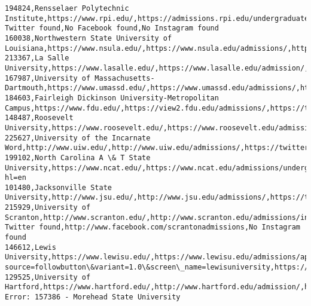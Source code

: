 \documentclass[11pt]{article}
\begin{document}
\begin{Verbatim}[commandchars=\\\{\}]
194824,Rensselaer Polytechnic Institute,https://www.rpi.edu/,https://admissions.rpi.edu/undergraduate,No Twitter found,No Facebook found,No Instagram found
160038,Northwestern State University of Louisiana,https://www.nsula.edu/,https://www.nsula.edu/admissions/,https://twitter.com/nsula,https://www.facebook.com/NorthwesternState,http://instagram.com/nsula
213367,La Salle University,https://www.lasalle.edu/,https://www.lasalle.edu/admission/,https://www.twitter.com/lasalleuniv,https://www.facebook.com/lasalleuniversity,https://www.instagram.com/lasalleuniv
167987,University of Massachusetts-Dartmouth,https://www.umassd.edu/,https://www.umassd.edu/admissions/,https://twitter.com/umassd,https://www.facebook.com/umassd,https://www.instagram.com/umassd/
184603,Fairleigh Dickinson University-Metropolitan Campus,https://www.fdu.edu/,https://view2.fdu.edu/admissions/,https://twitter.com/FDUWhatsNew,https://www.facebook.com/fairleighdickinsonuniversity,https://instagram.com/fduwhatsnew\#
148487,Roosevelt University,https://www.roosevelt.edu/,https://www.roosevelt.edu/admission,https://twitter.com/RooseveltU,https://www.facebook.com/RooseveltUniversity,https://www.instagram.com/RooseveltU/
225627,University of the Incarnate Word,http://www.uiw.edu/,http://www.uiw.edu/admissions/,https://twitter.com/uiw\_admissions,https://www.facebook.com/uiwartsfestival/,https://www.instagram.com/p/BpaCpSXH4m3/
199102,North Carolina A \& T State University,https://www.ncat.edu/,https://www.ncat.edu/admissions/undergraduate/index.html,http://twitter.com/ncatsuaggies,http://www.facebook.com/ncatsuaggies,https://www.instagram.com/ncatsuaggies/?hl=en
101480,Jacksonville State University,http://www.jsu.edu/,http://www.jsu.edu/admissions/,https://twitter.com/JSUNews,https://www.facebook.com/JacksonvilleStateUniversity,https://www.instagram.com/jacksonvillestateuniversity/
215929,University of Scranton,http://www.scranton.edu/,http://www.scranton.edu/admissions/index.shtml,No Twitter found,http://www.facebook.com/scrantonadmissions,No Instagram found
146612,Lewis University,https://www.lewisu.edu/,https://www.lewisu.edu/admissions/application.htm,https://twitter.com/intent/follow?source=followbutton\&variant=1.0\&screen\_name=lewisuniversity,https://www.facebook.com/lewisu.edu/app\_190322544333196,https://www.instagram.com/lewisuniversity/
129525,University of Hartford,https://www.hartford.edu/,http://www.hartford.edu/admission/,https://www.twitter.com/UofHartford,https://www.facebook.com/116079461746802/posts/2069766509711411,https://www.instagram.com/p/BpKbPVgBIkM/
Error: 157386 - Morehead State University

\end{Verbatim}
\end{document}
